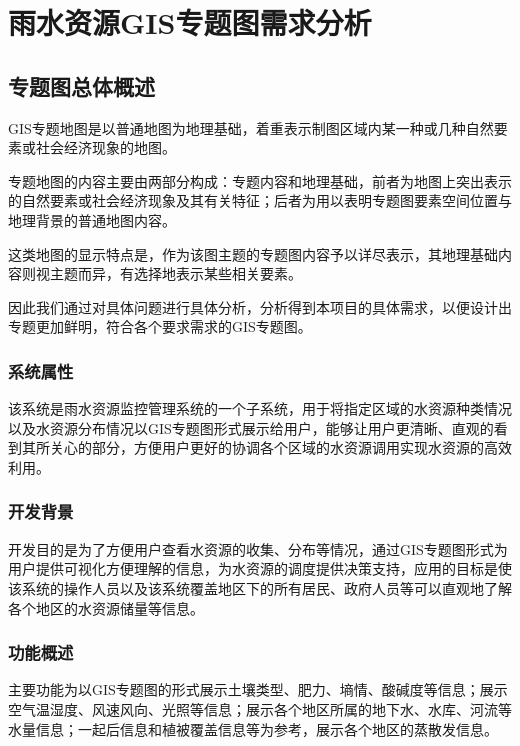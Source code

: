 \chapter{雨水资源GIS专题图需求分析}



\section{专题图总体概述}

GIS专题地图是以普通地图为地理基础，着重表示制图区域内某一种或几种自然要素或社会经济现象的地图。

专题地图的内容主要由两部分构成：专题内容和地理基础，前者为地图上突出表示的自然要素或社会经济现象及其有关特征；后者为用以表明专题图要素空间位置与地理背景的普通地图内容。

这类地图的显示特点是，作为该图主题的专题图内容予以详尽表示，其地理基础内容则视主题而异，有选择地表示某些相关要素。

因此我们通过对具体问题进行具体分析，分析得到本项目的具体需求，以便设计出专题更加鲜明，符合各个要求需求的GIS专题图。

\subsection{系统属性}

该系统是雨水资源监控管理系统的一个子系统，用于将指定区域的水资源种类情况以及水资源分布情况以GIS专题图形式展示给用户，能够让用户更清晰、直观的看到其所关心的部分，方便用户更好的协调各个区域的水资源调用实现水资源的高效利用。

\subsection{开发背景}

开发目的是为了方便用户查看水资源的收集、分布等情况，通过GIS专题图形式为用户提供可视化方便理解的信息，为水资源的调度提供决策支持，应用的目标是使该系统的操作人员以及该系统覆盖地区下的所有居民、政府人员等可以直观地了解各个地区的水资源储量等信息。

\subsection{功能概述}

主要功能为以GIS专题图的形式展示土壤类型、肥力、墒情、酸碱度等信息；展示空气温湿度、风速风向、光照等信息；展示各个地区所属的地下水、水库、河流等水量信息；一起后信息和植被覆盖信息等为参考，展示各个地区的蒸散发信息。

